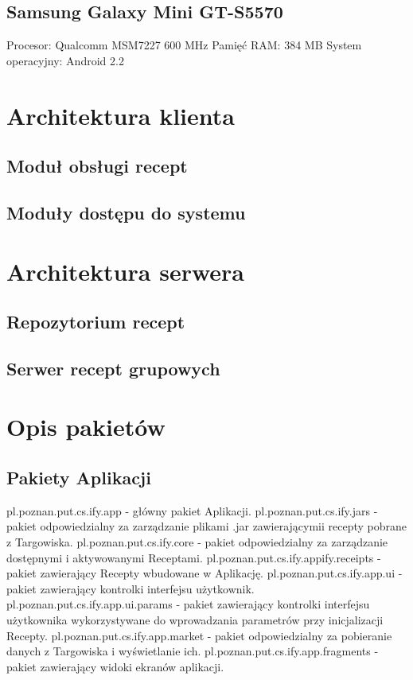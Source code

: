 \documentclass[11pt,a4paper,polish,thesis]{dcsbook}
\begin{document}
\subsection{Samsung Galaxy Mini GT-S5570}
Procesor: Qualcomm MSM7227 600 MHz
Pamięć RAM: 384 MB
System operacyjny: Android 2.2
\section{Architektura klienta}
\subsection{Moduł obsługi recept}
\subsection{Moduły dostępu do systemu}

\section{Architektura serwera}
\subsection{Repozytorium recept}
\subsection{Serwer recept grupowych}
\section{Opis pakietów}
\subsection{Pakiety Aplikacji}
pl.poznan.put.cs.ify.app - główny pakiet Aplikacji.
pl.poznan.put.cs.ify.jars - pakiet odpowiedzialny za zarządzanie plikami .jar zawierającymii recepty pobrane z Targowiska.
pl.poznan.put.cs.ify.core - pakiet odpowiedzialny za zarządzanie dostępnymi i aktywowanymi Receptami.
pl.poznan.put.cs.ify.appify.receipts - pakiet zawierający Recepty wbudowane w Aplikację.
pl.poznan.put.cs.ify.app.ui - pakiet zawierający kontrolki interfejsu użytkownik.
pl.poznan.put.cs.ify.app.ui.params - pakiet zawierający kontrolki interfejsu użytkownika wykorzystywane do wprowadzania parametrów przy inicjalizacji Recepty.
pl.poznan.put.cs.ify.app.market - pakiet odpowiedzialny za pobieranie danych z Targowiska i wyświetlanie ich.
pl.poznan.put.cs.ify.app.fragments - pakiet zawierający widoki ekranów aplikacji.
\end{document}
